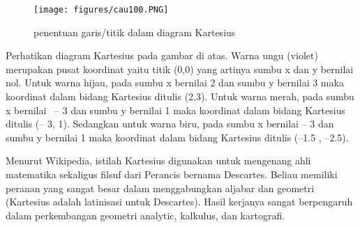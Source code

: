 \begin{figure}[ht]
	\centerline{\texttt{[image: figures/cau100.PNG]}}
	\caption{penentuan garis/titik dalam diagram Kartesius}
	\label{cau100}
	\end{figure}

Perhatikan diagram Kartesius pada gambar di atas. Warna ungu (violet) merupakan pusat koordinat yaitu titik (0,0) yang artinya sumbu x dan y bernilai nol. Untuk warna hijau, pada sumbu x bernilai 2 dan sumbu y bernilai 3 maka koordinat dalam bidang Kartesius ditulis (2,3). Untuk warna merah, pada sumbu x bernilai  – 3 dan sumbu y bernilai 1 maka koordinat dalam bidang Kartesius ditulis (– 3, 1). Sedangkan untuk warna biru, pada sumbu x bernilai – 3 dan sumbu y bernilai 1 maka koordinat dalam bidang Kartesius ditulis (–1.5 , –2.5).

Menurut Wikipedia, istilah Kartesius digunakan untuk mengenang ahli matematika sekaligus filsuf dari Perancis bernama Descartes. Beliau memiliki peranan yang sangat besar dalam menggabungkan aljabar dan geometri (Kartesius adalah latinisasi untuk Descartes). Hasil kerjanya sangat berpengaruh dalam perkembangan geometri analytic, kalkulus, dan kartografi.


